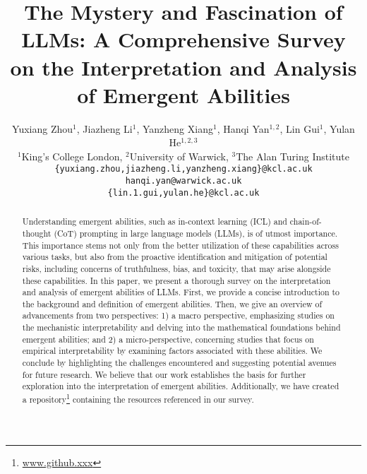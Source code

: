 \documentclass[11pt,a4paper]{article}
\title{The Mystery and Fascination of LLMs: A Comprehensive Survey \\
on the Interpretation and Analysis of Emergent Abilities}
\author{Yuxiang Zhou$^1$, Jiazheng Li$^1$, Yanzheng Xiang$^{1}$, Hanqi Yan$^{1,2}$, Lin Gui$^{1}$, Yulan He$^{1,2,3}$ \\
$^{1}$King's College London, $^{2}$University of Warwick, $^{3}$The Alan Turing Institute\\
        \texttt{\{yuxiang.zhou,jiazheng.li,yanzheng.xiang\}@kcl.ac.uk}\\
       	\texttt{hanqi.yan@warwick.ac.uk}\\
        \texttt{\{lin.1.gui,yulan.he\}@kcl.ac.uk}}
\date{}
\begin{document}
\maketitle
\begin{abstract}
Understanding emergent abilities, %
such as in-context learning (ICL) and chain-of-thought (CoT) prompting 
in large language models (LLMs), is of utmost importance.
This importance stems not only from the better utilization of these capabilities across various tasks, but also from the proactive identification and mitigation of potential risks, including concerns of truthfulness, bias, and toxicity, that may arise alongside these capabilities.
In this paper, we present a thorough survey on the interpretation and analysis of emergent abilities of LLMs.
First, we provide a concise introduction to the background and definition of emergent abilities.
Then, we give an overview of advancements from two perspectives: 1) a macro perspective, emphasizing studies on the mechanistic interpretability and delving into the mathematical foundations behind emergent abilities; and 2) a micro-perspective, concerning studies that focus on empirical interpretability by examining factors associated with these abilities.
We conclude by highlighting the challenges encountered and suggesting potential avenues for future research.
We believe that our work establishes the basis for further exploration into the interpretation of emergent abilities. 
Additionally, we have created a repository\footnote{\url{www.github.xxx}} containing the resources referenced in our survey.
\end{abstract}

\end{document}
